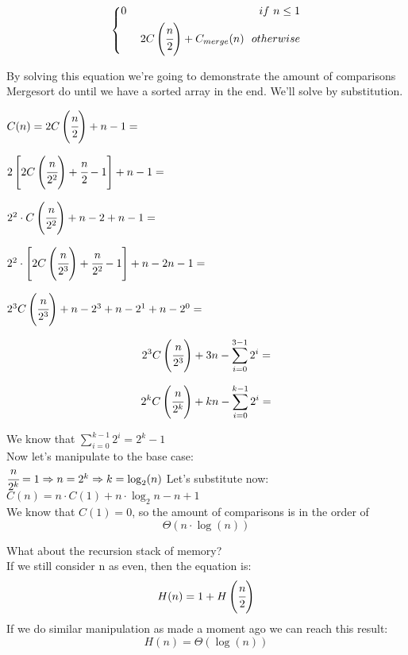 \documentclass{article}
\begin{document}
\begin{equation*}
	\left\{ \begin{aligned}
	0 \ \ \ \ \ \ \ \ \ \ \ \ \ \ \ \ \ \ \ \ \ \ \ \ \ \ \ \ \ \ \ \ \ \ \ \ if \ n \leq 1 \\
	2C\left(\cfrac{n}{2}\right) + C_{merge}(n) \ \ otherwise
	\end{aligned} \right.
\end{equation*}

By solving this equation we're going to demonstrate the amount of comparisons Mergesort do until we have a sorted array in the end. We'll solve by substitution.\\
\begin{large}

$C(n) = 2C\left(\cfrac{n}{2}\right) + n-1 =$

$2\left[2C\left(\cfrac{n}{2^2}\right) + \cfrac{n}{2} -1 \right] + n-1=$

$2^2\cdot C\left(\cfrac{n}{2^2}\right) + n-2 + n-1=$

$2^2\cdot \left[2C\left(\cfrac{n}{2^3}\right) + \cfrac{n}{2^2} -1 \right] + n-2 n-1=$

$2^3C\left(\cfrac{n}{2^3}\right) + n-2^3 + n-2^1 + n - 2^0=$

$$2^3C\left(\cfrac{n}{2^3}\right) + 3n - \sum_{i=0}^{3-1}2^i=$$

$$2^kC\left(\cfrac{n}{2^k}\right) + kn - \sum_{i=0}^{k-1}2^i=$$

We know that $\sum_{i=0}^{k-1}2^i = 2^k  -1$ \\
Now let's manipulate to the base case:\\
$\cfrac{n}{2^k} = 1 \Rightarrow n = 2^k \Rightarrow k = \log_2(n)$
Let's substitute now:\\
$C(n) = n\cdot C(1) + n\cdot\log_2{n} - n + 1 $ \\

We know that $C(1) = 0$, so the amount of comparisons is in the order of $$\Theta(n\cdot\log(n))$$
\end{large}
What about the recursion stack of memory?\\
If we still consider n as even, then the equation is:\\
$$H(n) = 1 + H\left(\cfrac{n}{2}\right)$$
If we do similar manipulation as made a moment ago we can reach this result:\\
$$H(n) = \Theta(\log(n))$$
\end{document}

